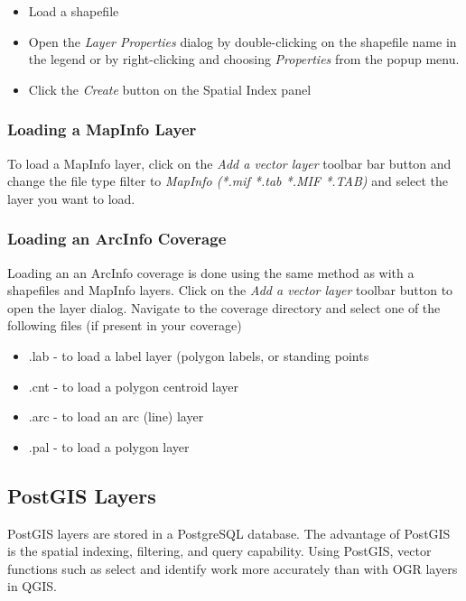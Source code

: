 \begin{itemize}
\item Load a shapefile
\item Open the \textit{Layer Properties} dialog by double-clicking on the
shapefile name in the legend or by right-clicking and choosing
\textit{Properties} from the popup menu.
\item Click the \textit{Create} button on the Spatial Index panel
\end{itemize}

\subsubsection{Loading a MapInfo Layer}

To load a MapInfo layer, click on the \textit{Add a vector layer}
toolbar bar button and change the file type filter to \textit{MapInfo (*.mif
*.tab *.MIF *.TAB)} and select the layer you want to load.

\subsubsection{Loading an ArcInfo Coverage}

Loading an an ArcInfo coverage is done using the same method as with a
shapefiles and MapInfo layers. Click on the \textit{Add a vector layer}
toolbar button to open the layer dialog.  Navigate to the coverage directory
and select one of the following files (if present in your coverage)

\begin{itemize}
\item .lab - to load a label layer (polygon labels, or standing points
\item .cnt - to load a polygon centroid layer 
\item .arc - to load an arc (line) layer
\item .pal - to load a polygon layer
\end{itemize}

\subsection{PostGIS Layers}\label{label_postgis} 

PostGIS layers are stored in a PostgreSQL database. The advantage of PostGIS
is the spatial indexing, filtering, and query capability. Using PostGIS,
vector functions such as select and identify work more accurately than with
OGR layers in QGIS.

